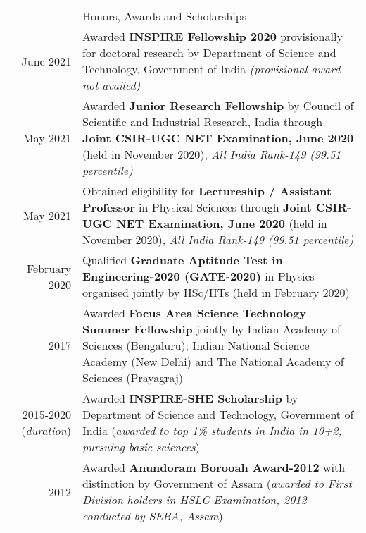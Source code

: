 \documentclass[a4paper, 11pt]{article}
\newcommand{\headingfont}{\Large\color{Bittersweet}}
\newenvironment{SectionTable}[1]{
	\renewcommand*{\arraystretch}{1.7}
	\setlength{\tabcolsep}{10pt}
	\begin{longtable}{Rp{5.2in}} & #1 \\}
{\end{longtable}\vspace{-.3cm}}
\begin{document}
\begin{SectionTable}{\headingfont Honors, Awards and Scholarships}
June 2021 & 
Awarded \textbf{INSPIRE Fellowship 2020} provisionally for doctoral research by Department of Science and Technology, Government of India \textit{(provisional award not availed)}
 \\

May 2021 &
Awarded \textbf{Junior Research Fellowship} by Council of Scientific and
Industrial Research, India through \textbf{Joint CSIR-UGC NET Examination, June 2020}
(held in November 2020), \textit{All India Rank-149 (99.51 percentile)} \\

May 2021 &
Obtained eligibility for \textbf{Lectureship / Assistant Professor} in Physical Sciences through \textbf{Joint CSIR-UGC NET Examination, June 2020}
(held in November 2020), \textit{All India Rank-149 (99.51 percentile)} \\

February 2020 &
Qualified \textbf{Graduate Aptitude Test in Engineering-2020 (GATE-2020)} in Physics organised jointly by IISc/IITs (held in February 2020) \\

2017 &
Awarded \textbf{Focus Area Science Technology Summer Fellowship} jointly by Indian Academy of Sciences (Bengaluru); Indian National Science Academy (New Delhi) and The National Academy of Sciences (Prayagraj) \\

2015-2020 (\textit{duration})&
Awarded \textbf{INSPIRE-SHE Scholarship} by Department of Science and Technology, Government of India (\textit{awarded to top 1\% students in India in 10+2, pursuing basic sciences}) \\

2012 &
Awarded \textbf{Anundoram Borooah Award-2012} with distinction by Government of Assam (\textit{awarded to First Division holders in HSLC Examination, 2012 conducted by SEBA, Assam})

\end{SectionTable}










\end{document}
